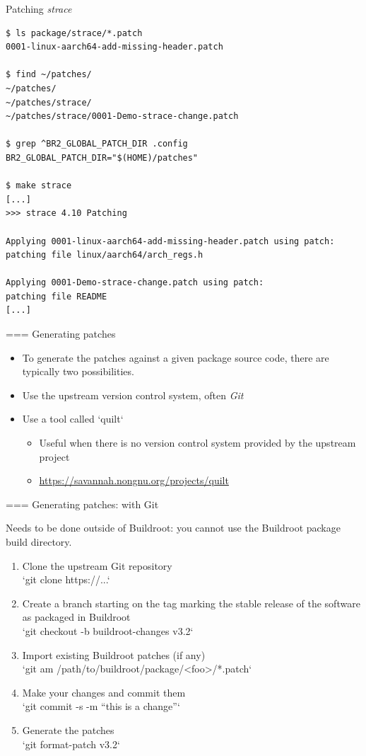 \begin{block}{Patching {\em strace}}
{\tiny
\begin{verbatim}
$ ls package/strace/*.patch
0001-linux-aarch64-add-missing-header.patch

$ find ~/patches/
~/patches/
~/patches/strace/
~/patches/strace/0001-Demo-strace-change.patch

$ grep ^BR2_GLOBAL_PATCH_DIR .config BR2_GLOBAL_PATCH_DIR="$(HOME)/patches"

$ make strace
[...]
>>> strace 4.10 Patching

Applying 0001-linux-aarch64-add-missing-header.patch using patch: 
patching file linux/aarch64/arch_regs.h

Applying 0001-Demo-strace-change.patch using patch: 
patching file README
[...]
\end{verbatim}}
\end{block}



=== {Generating patches}
  \begin{itemize}
  \item To generate the patches against a given package source code,
    there are typically two possibilities.
  \item Use the upstream version control system, often {\em Git}
  \item Use a tool called `quilt`
    \begin{itemize}
    \item Useful when there is no version control system provided by
      the upstream project
    \item \url{https://savannah.nongnu.org/projects/quilt}
    \end{itemize}
  \end{itemize}


=== {Generating patches: with Git}

  Needs to be done outside of Buildroot: you cannot use the Buildroot
  package build directory.

  \begin{enumerate}
  \item Clone the upstream Git repository\\
    `git clone https://...`
  \item Create a branch starting on the tag marking the stable
    release of the software as packaged in Buildroot\\
    `git checkout -b buildroot-changes v3.2`
  \item Import existing Buildroot patches (if any)\\
    `git am /path/to/buildroot/package/<foo>/*.patch`
  \item Make your changes and commit them\\
    `git commit -s -m ``this is a change''`
  \item Generate the patches\\
    `git format-patch v3.2`
  \end{enumerate}



